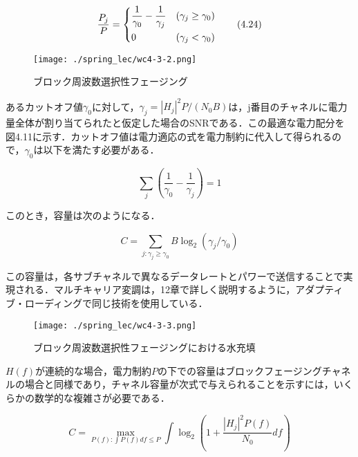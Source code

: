 \documentclass[dvipdfmx]{jsarticle}
\begin{document}
\begin{equation}
\frac{P_j}{P} =
\begin{dcases}
\frac{1}{\gamma_0} - \frac{1}{\gamma_j} & (\gamma_j \geq \gamma_0) \\
0 & (\gamma_j < \gamma_0)
\end{dcases}
\tag{4.24}
\end{equation}

\begin{figure}[htbp]
\begin{center}
\texttt{[image: ./spring\_lec/wc4-3-2.png]}
\end{center}
\caption{ブロック周波数選択性フェージング}
\end{figure}

\noindent
あるカットオフ値$\gamma_0$に対して，$\gamma_j = |H_j|^2 P / (N_0 B)$は，j番目のチャネルに電力量全体が割り当てられたと仮定した場合のSNRである．この最適な電力配分を図4.11に示す．カットオフ値は電力適応の式を電力制約に代入して得られるので，$\gamma_0 $は以下を満たす必要がある．

\begin{equation}
    \sum_j (\frac{1}{\gamma_0} - \frac{1}{\gamma_j}) = 1
\tag{4.25}
\end{equation}

\noindent
このとき，容量は次のようになる．

\begin{equation}
    C = \sum_{j:\gamma_j \geq \gamma_0} B \log_2 (\gamma_j / \gamma_0)
\tag{4.26}
\end{equation}

\noindent
この容量は，各サブチャネルで異なるデータレートとパワーで送信することで実現される．マルチキャリア変調は，12章で詳しく説明するように，アダプティブ・ローディングで同じ技術を使用している．

\begin{figure}[htbp]
\begin{center}
\texttt{[image: ./spring\_lec/wc4-3-3.png]}
\end{center}
\caption{ブロック周波数選択性フェージングにおける水充填}
\end{figure}

$H(f)$が連続的な場合，電力制約$P$の下での容量はブロックフェージングチャネルの場合と同様であり，チャネル容量が次式で与えられることを示すには，いくらかの数学的な複雑さが必要である．

\begin{equation}\label{}
    C = \max_{P(f):\int P(f) df \leq P} \int \log_2 (1 + \frac{|H_j|^2 P(f)}{N_0} df)
\tag{4.27}
\end{equation}
\end{document}
